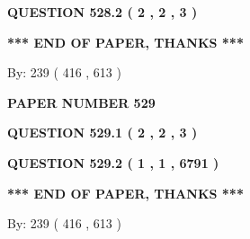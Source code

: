 \documentclass[12pt]{article}
\begin{document}
  
  
\vspace{0.2in}
  
{\textbf{\Large{QUESTION
528.2 
 ( 2 , 2 , 3 )
}}}
  
  
   
   
 \vspace{0.2in}
 
   
   
   
   
\vspace{1.0in} 
{\textbf{\large{ *** END OF PAPER, THANKS *** }}} 
   
   
\hspace{1.0in} By: 
 239 ( 416 ,  613 )
   
   
   
   
\newpage 
\setcounter{page}{ 
   529001 } 
   
   
   
   
 {\textbf{ \Large{ PAPER NUMBER  529  }}}
   
   
\vspace{0.2in}
   
   
   
   
   
   
 \vspace{0.2in}
 
 
 
 
   
   
  
\vspace{0.2in}
  
{\textbf{\Large{QUESTION
529.1 
 ( 2 , 2 , 3 )
}}}
  
  
  
\vspace{0.2in}
  
{\textbf{\Large{QUESTION
529.2 
 ( 1 , 1 , 6791 )
}}}
  
  
   
   
 \vspace{0.2in}
 
   
   
   
   
\vspace{1.0in} 
{\textbf{\large{ *** END OF PAPER, THANKS *** }}} 
   
   
\hspace{1.0in} By: 
 239 ( 416 ,  613 )
   
   
   
\end{document}
